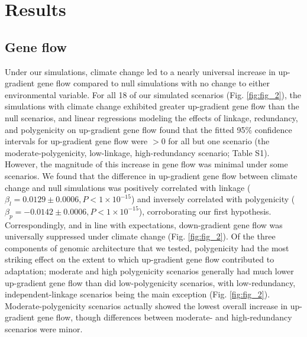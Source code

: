 \documentclass[9pt,twocolumn,twoside,lineno]{new_article}
\begin{document}
\section*{Results}

\subsection*{Gene flow}
Under our simulations, climate change led to a nearly universal increase in up-gradient gene flow
compared to null simulations with no change to either environmental variable. For all 18 of our simulated scenarios (Fig. \ref{fig:fig_2}), the simulations with climate change exhibited greater up-gradient gene flow than the null scenarios, and linear regressions modeling the effects of linkage, redundancy, and polygenicity on up-gradient gene flow found that the 
fitted 95\% confidence intervals for up-gradient gene flow were $>0$ for all but
one scenario (the moderate-polygenicity, low-linkage, high-redundancy scenario; Table S1).
However, the magnitude of this increase in gene flow was minimal under
some scenarios. We found that the difference in up-gradient gene flow between climate change and null simulations was positively correlated with linkage
($\beta_{l} = 0.0129\pm0.0006, P<1\times10^{-15}$)
and inversely correlated with polygenicity
($\beta_{p} = -0.0142\pm0.0006, P<1\times10^{-15}$),
corroborating our first hypothesis.
Correspondingly, and in line with expectations, down-gradient gene flow was 
universally suppressed under climate change (Fig. \ref{fig:fig_2}).
Of the three components of genomic architecture that we tested,
polygenicity had the most striking effect on the extent to which
up-gradient gene flow contributed to adaptation;
moderate and high polygenicity scenarios generally had much lower
up-gradient gene flow than did low-polygenicity scenarios,
with low-redundancy, independent-linkage scenarios being the main exception (Fig. \ref{fig:fig_2}).
Moderate-polygenicity scenarios actually showed the lowest overall increase
in up-gradient gene flow, though differences between moderate- and
high-redundancy scenarios were minor.
\end{document}
